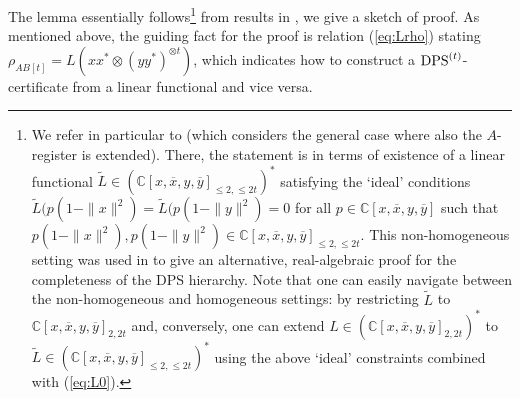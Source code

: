 \documentclass[11pt]{article}
\makeatletter
\newcommand{\C}{\ensuremath{\mathbb{C}}} %
\newcommand{\DPS}{\text{\rm DPS}}
\newcommand{\ox}{\overline x}
\newcommand{\oy}{\overline y}
\newcommand{\ot}{\otimes}
\newcommand{\ovx}{\overline x}
\newcommand{\ovy}{\overline y}
\theoremstyle{plain}
\renewenvironment{proof}[1][\proofname]{%
  \par
  \pushQED{}%
  \normalfont
  \topsep6\p@\@plus6\p@
  \trivlist
  \item[\hskip\labelsep\itshape #1\@addpunct{.}]%
}{%
  \popQED
  \endtrivlist
}
\makeatother
\begin{document}
\begin{proof}
  The lemma essentially follows\footnote{We refer in particular to \cite[Prop.23]{GLS_2021} (which considers the general case where also the $A$-register is extended). There, the statement is in terms of existence of a linear functional $\tilde L\in (\C[x,\ovx,y,\ovy]_{\le 2,\le 2t})^*$
  satisfying the `ideal' conditions 
  $\tilde L(p(1-\|x\|^2)=\tilde L(p(1-\|y\|^2)=0$ for all  $p\in \C[x,\ovx,y,\ovy]$ such that
  $p(1-\|x\|^2), p(1-\|y\|^2)\in \C[x,\ovx,y,\ovy]_{\le 2,\le 2t}.$ This non-homogeneous setting was used in \cite{GLS_2021} to give an alternative, real-algebraic proof for the completeness of the DPS hierarchy. 
  Note that one can easily navigate between the non-homogeneous and homogeneous settings:  by restricting   $\tilde L$ to $\C[x,\ox,y,\oy]_{2,2t}$ and, conversely, one can extend $L\in (\C[x,\ox,y,\oy]_{2,2t})^*$ to $\tilde L\in (\C[x,\ovx,y,\ovy]_{\le 2,\le 2t})^*$ using the above `ideal' constraints combined with  (\ref{eq:L0}). }  
  from results in \cite[Section 5]{GLS_2021},  
   we   give a   sketch of proof. %
As mentioned above, the guiding fact for the proof is relation (\ref{eq:Lrho}) stating $\rho_{AB[t]}=L(xx^*\ot (yy^*)^{\ot t})$, which indicates how to construct a $\DPS^{(t)}$-certificate from a linear functional and vice versa.


\end{proof}
\end{document}

